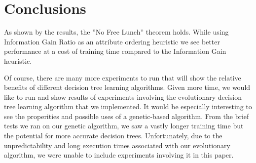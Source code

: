 \documentclass[12pt, letterpaper]{article}
\begin{document}
\section{Conclusions}
As shown by the results, the ''No Free Lunch'' theorem holds.  While using
Information Gain Ratio as an attribute ordering heuristic we see better performance
at a cost of training time compared to the Information Gain heuristic.

Of course, there are many more experiments to run that will show the relative benefits
of different decision tree learning algorithms.  Given more time, we would like to run 
and show results of experiments involving the evolutionary decision tree learning algorithm
that we implemented.  It would be especially interesting to see the properities and possible
uses of a genetic-based algorithm. From the brief tests we ran on our genetic algorithm, we
saw a vastly longer training time but the potential for more accurate decision trees. Unfortunately, 
due to the unpredictability and long execution times associated with our evolutionary algorithm, 
we were unable to include experiments involving it in this paper.  


\end{document}
